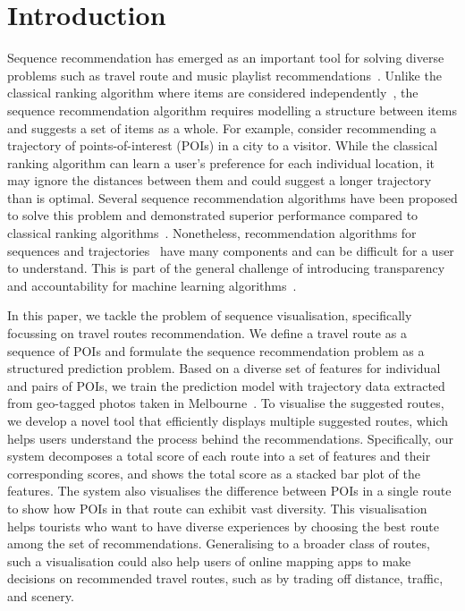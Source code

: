 
\section{Introduction}
Sequence recommendation has emerged as an important tool for solving diverse problems such as travel route and music playlist recommendations~\cite{chen2017SR}. 
Unlike the classical ranking algorithm where items are considered independently~\cite{koren2009matrix},
the sequence recommendation algorithm requires modelling a structure between items and suggests a set of items as a whole. 
For example, consider recommending a trajectory of points-of-interest (POIs) in a city to a visitor. 
While the classical ranking algorithm can learn a user's preference for each individual location, it may ignore the distances between them and could suggest a longer trajectory than is optimal. 
Several sequence recommendation algorithms have been proposed to solve this problem and demonstrated superior performance compared to classical ranking algorithms~\cite{ijcai15,chen2017SR}. 
Nonetheless, recommendation algorithms for sequences and trajectories~\cite{chen2016learning,chen2017SR} have many components and can be difficult for a user to understand. This is part of the general challenge of introducing transparency and accountability for machine learning algorithms~\cite{fatml}. 

In this paper, we tackle the problem of sequence visualisation, specifically focussing on travel routes recommendation. 
We define a travel route as a sequence of POIs and formulate the sequence recommendation problem as a structured prediction problem. 
Based on a diverse set of features for individual and pairs of POIs, we train the prediction model with trajectory data extracted from geo-tagged photos taken in Melbourne~\cite{chen2016learning}. 
To visualise the suggested routes, we develop a novel tool that efficiently displays multiple suggested routes, which helps users understand the process behind the recommendations.
Specifically, our system decomposes a total score of each route into a set of features and their corresponding scores, and shows the total score as a stacked bar plot of the features.
The system also visualises the difference between POIs in a single route to show how POIs in that route can exhibit vast diversity. 
This visualisation helps tourists who want to have diverse experiences by choosing the best route among the set of recommendations. Generalising to a broader class of routes, such a visualisation could also help users of online mapping apps to make decisions on recommended travel routes, such as by trading off distance, traffic, and scenery. 
